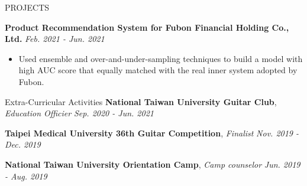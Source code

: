 \documentclass{resume} %
\begin{document}
\begin{rSection}{PROJECTS}
\item \textbf{Product Recommendation System for Fubon Financial Holding Co., Ltd.} \hfill \textit{Feb. 2021 - Jun. 2021}
\begin{itemize}
    \itemsep -3pt
    \item Used ensemble and over-and-under-sampling techniques to build a model with high AUC score that equally matched with the real inner system adopted by Fubon.
\end{itemize}




\end{rSection} 

\begin{rSection}{Extra-Curricular Activities} 
\textbf{National Taiwan University Guitar Club}, \textit{Education Officier} \hfill \textit{Sep. 2020 - Jun. 2021}

\textbf{Taipei Medical University 36th Guitar Competition}, \textit{Finalist}  \hfill \textit{Nov. 2019 - Dec. 2019} 


\textbf{National Taiwan University Orientation Camp}, \textit{Camp counselor}  \hfill \textit{Jun. 2019 - Aug. 2019} 



\end{rSection}

\end{document}
